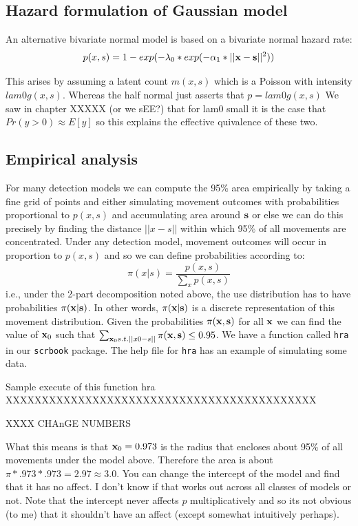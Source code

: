 \subsection{Hazard formulation of Gaussian model}

An alternative bivariate normal model is based on a bivariate normal hazard rate:
\begin{equation}
p(x,s) = 1-exp(-\lambda_{0}*exp(-\alpha_{1}*||{\bf x}-{\bf s}||^2))
\label{scr0.eq.hazard}
\end{equation}

This arises by assuming a latent count $m(x,s)$ which is a Poisson
with intensity $lam0 g(x,s)$. Whereas the half normal just asserts
that
$p = lam0 g(x,s)$
We saw in chapter XXXXX (or we sEE?) that for lam0 small 
it is the case that $Pr(y>0) \approx E[y]$ so this explains the
effective quivalence of these two. 


\subsection{Empirical analysis}

For many detection models we can compute the 95\% area empirically
by taking a fine grid of points and 
either simulating movement outcomes with probabilities proportional to
$p(x,s)$ and accumulating area around ${\bf s}$ or else we can do this precisely
by finding the distance $||x-s||$ within which 95\% of all movements are
concentrated. 
Under any detection model, movement outcomes will occur
in proportion to $p(x,s)$ and so we can define probabilities according
to:
\[
 \pi(x|s) =\frac{p(x,s)}{\sum_{x} p(x,s) }
\]
i.e., under the 2-part decomposition noted above, the use 
distribution has to have probabilities $\pi({\bf x}|{\bf s})$. In
other words, $\pi({\bf x}|{\bf s})$ is a discrete representation of
this movement distribution.  Given the probabilities $\pi({\bf
  x},{\bf s})$ for all ${\bf x}$ we can find the value of ${\bf x}_{0}$ such that
$\sum_{{\bf x}_0 s.t. ||x0-s||} \pi({\bf x},{\bf s}) \le 0.95$.
We have a function called \mbox{\tt hra} in our \mbox{\tt scrbook}
package. The help file for \mbox{\tt hra} has an example of simulating
some data. 

Sample execute of this function hra 
XXXXXXXXXXXXXXXXXXXXXXXXXXXXXXXXXXXXXXXXXXX


XXXX CHAnGE NUMBERS 

What this means is that ${\bf x}_0 = 0.973$ is the radius that
encloses about 95\% of all movements under the model above. Therefore
the area is about $\pi*.973*.973 = 2.97 \approx 3.0$.  You can change
the intercept of the model and find that it has no affect. I don't
know if that works out across all classes of models or not. Note that
the intercept never affects $p$ multiplicatively and so its not
obvious (to me) that it shouldn't have an affect (except somewhat
intuitively perhaps).


